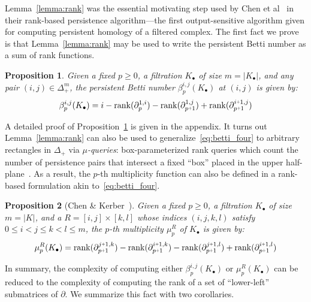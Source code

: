 \documentclass[10pt]{article}
\numberwithin{equation}{section}
\newcommand{\+}{%
	\raisebox{0.18ex}{\scaleobj{0.55}{+}}
}
\newtheorem{proposition}{Proposition}
\theoremstyle{definition}
\begin{document}
Lemma~\ref{lemma:rank} was the essential motivating step used by Chen et al~\cite{chen2011output} in their rank-based persistence algorithm---the first output-sensitive algorithm given for computing persistent homology of a filtered complex.
The first fact we prove is that Lemma~\ref{lemma:rank} may be used to write the persistent Betti number as a sum of rank functions. 
\begin{proposition}\label{prop:rank_reduction}
Given a fixed $p \geq 0$, a filtration $K_\bullet$ of size $m = \lvert K_\bullet \rvert$, and any pair $(i,j) \in \Delta_+^m$, the persistent Betti number $\beta_p^{i,j}(K_\bullet)$ at $(i,j)$ is given by:
	\begin{equation}\label{eq:betti_four}
	\beta_p^{i,j}(K_\bullet) = i - \mathrm{rank}(\partial_p^{1,i}) - \mathrm{rank}(\partial_{p\+1 }^{1,j}) + \mathrm{rank}(\partial_{p\+1}^{i \+ 1, j} )
	\end{equation}
\end{proposition}
\noindent A detailed proof of Proposition~\ref{prop:rank_reduction} is given in the appendix. It turns out Lemma~\ref{lemma:rank} can also be used to generalize~\eqref{eq:betti_four} to arbitrary rectangles in $\Delta_+$ via $\mu$\emph{-queries}: box-parameterized rank queries which count the number of persistence pairs that intersect a fixed ``box'' placed in the upper half-plane~\cite{chen2011output}. 
As a result, the $p$-th multiplicity function can also be defined in a rank-based formulation akin to~\eqref{eq:betti_four}. 
\begin{proposition}[Chen \& Kerber~\cite{chen2011output}]\label{prop:mu_reduction}
Given a fixed $p \geq 0$, a filtration $K_\bullet$ of size $m = \lvert K \rvert$, and a $R = [i,j] \times [k,l]$ whose indices $(i,j,k,l)$ satisfy $0 \leq i < j \leq k < l \leq m$, the $p$-th multiplicity $\mu_p^{R}$ of $K_\bullet$ is given by:
	\begin{equation}\label{eq:mu_four}
	\mu_p^{R}(K_\bullet) = \mathrm{rank}(\partial_{p\+1}^{j \+ 1, k})  - \mathrm{rank}(\partial_{p\+1}^{i \+ 1, k})  - \mathrm{rank}(\partial_{p\+1}^{j \+ 1, l}) + \mathrm{rank}(\partial_{p\+1}^{i \+ 1, l}) 
	\end{equation}
\end{proposition}
\noindent In summary, the complexity of computing either $\beta_p^{i,j}(K_\bullet)$ or $\mu_p^{R}(K_\bullet)$ can be reduced to the complexity of computing the rank of a set of ``lower-left'' submatrices of $\partial$. We summarize this fact with two corollaries.
\end{document}

